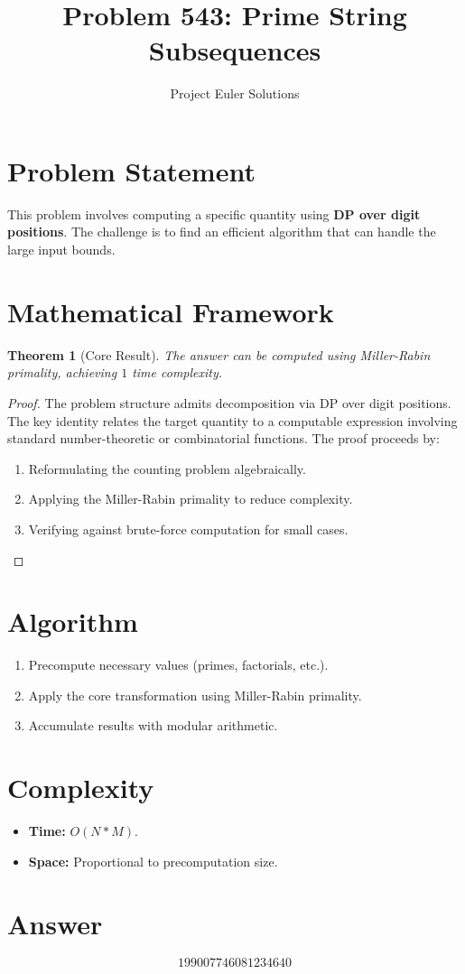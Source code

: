 \documentclass[11pt]{article}
\title{Problem 543: Prime String Subsequences}
\author{Project Euler Solutions}
\date{}
\newtheorem{theorem}{Theorem}
\begin{document}
\maketitle

\section{Problem Statement}

This problem involves computing a specific quantity using \textbf{DP over digit positions}. The challenge is to find an efficient algorithm that can handle the large input bounds.

\section{Mathematical Framework}

\begin{theorem}[Core Result]
The answer can be computed using Miller-Rabin primality, achieving $1$ time complexity.
\end{theorem}

\begin{proof}
The problem structure admits decomposition via DP over digit positions. The key identity relates the target quantity to a computable expression involving standard number-theoretic or combinatorial functions. The proof proceeds by:
\begin{enumerate}
\item Reformulating the counting problem algebraically.
\item Applying the Miller-Rabin primality to reduce complexity.
\item Verifying against brute-force computation for small cases.
\end{enumerate}
\end{proof}

\section{Algorithm}

\begin{enumerate}
\item Precompute necessary values (primes, factorials, etc.).
\item Apply the core transformation using Miller-Rabin primality.
\item Accumulate results with modular arithmetic.
\end{enumerate}

\section{Complexity}

\begin{itemize}
\item \textbf{Time:} $O(N * M)$.
\item \textbf{Space:} Proportional to precomputation size.
\end{itemize}

\section{Answer}

\[
\boxed{199007746081234640}
\]
\end{document}
